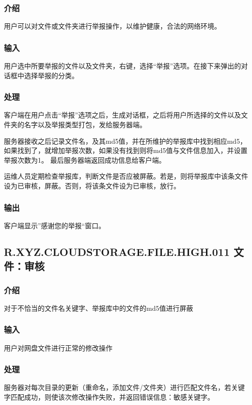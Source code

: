\subsubsection{介绍}
用户可以对文件或文件夹进行举报操作，以维护健康，合法的网络环境。

\subsubsection{输入} 
用户选中所要举报的文件以及文件夹，右键，选择“举报”选项。在接下来弹出的对话框中选择举报的分类。

\subsubsection{处理} 
客户端在用户点击“举报”选项之后，生成对话框，之后将用户所选择的文件以及文件夹的名字以及举报类型打包，发给服务器端。

服务器接收之后记录文件名，及其md5值，并在所维护的举报库中找到相应md5，如果找到了，就增加举报次数，如果没有找到则将md5值与文件信息加入，并设置举报次数为1。
最后服务器端返回成功信息给客户端。

运维人员定期检查举报库，判断文件是否应被屏蔽。若是，则将举报库中该条文件设为已审核，屏蔽。否则，将该条文件设为已审核，放行。

\subsubsection{输出} 
客户端显示”感谢您的举报“窗口。


\subsection{R.XYZ.CLOUDSTORAGE.FILE.HIGH.011 文件：审核}

\subsubsection{介绍}
对于不恰当的文件名关键字、举报库中的文件的md5值进行屏蔽

\subsubsection{输入} 
用户对网盘文件进行正常的修改操作

\subsubsection{处理} 
服务器对每次目录的更新（重命名，添加文件/文件夹）进行匹配文件名，若关键字匹配成功，则使该次修改操作失败，并返回错误信息：敏感关键字。

